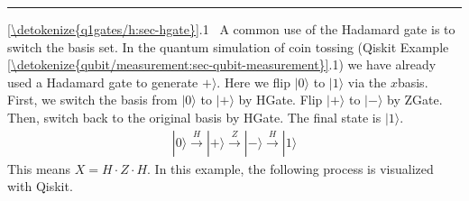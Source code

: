 \documentclass[letterpaper,10pt,english]{jupyterBook}
\begin{document}
\bigskip\hrule\bigskip


\sphinxAtStartPar
{} \hyperref[\detokenize{q1gates/h:sec-hgate}]{\ref{\detokenize{q1gates/h:sec-hgate}}}.1  A common use of the Hadamard gate is to switch the basis set.  In the quantum simulation of coin tossing (Qiskit Example \hyperref[\detokenize{qubit/measurement:sec-qubit-measurement}]{\ref{\detokenize{qubit/measurement:sec-qubit-measurement}}}.1) we have already used a Hadamard gate to generate \(+\rangle\).
Here we flip \(|0\rangle\) to \(|1\rangle\) via the \(x\)\sphinxhyphen{}basis.  First, we switch the basis from \(|0\rangle\) to \(|+\rangle\) by HGate.  Flip \(|+\rangle\) to \(|-\rangle\) by ZGate.  Then, switch back to the original basis by HGate.  The final state is \(|1\rangle\).
\begin{equation*}
\begin{split}
|0\rangle \xrightarrow{H} |+\rangle \xrightarrow{Z} |-\rangle \xrightarrow{H} |1\rangle
\end{split}
\end{equation*}
\sphinxAtStartPar
This means \(X = H \cdot Z \cdot H\).
In this example, the following process is visualized with Qiskit.
\end{document}
